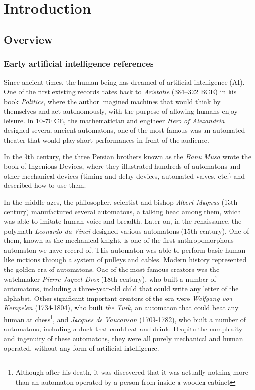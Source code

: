 \chapter{Introduction} \label{ch:introduction}
\section{Overview}
\subsection{Early artificial intelligence references}
Since ancient times, the human being has dreamed of artificial intelligence (AI). One of the first existing records dates back to \textit{Aristotle} (384–322 BCE) in his book \textit{Politics}, where the author imagined machines that would think by themselves and act autonomously, with the purpose of allowing humans enjoy leisure. In 10-70 CE, the mathematician and engineer \textit{Hero of Alexandria} designed several ancient automatons, one of the most famous was an automated theater that would play short performances in front of the audience.

In the 9th century, the three Persian brothers known as the \textit{Banū Mūsā} wrote the book of Ingenious Devices, where they illustrated hundreds of automatons and other mechanical devices (timing and delay devices, automated valves, etc.) and described how to use them.

In the middle ages, the philosopher, scientist and bishop \textit{Albert Magnus} (13th century) manufactured several automatons, a talking head among them, which was able to imitate human voice and breadth. Later on, in the renaissance, the polymath \textit{Leonardo da Vinci} designed various automatons (15th century). One of them, known as the mechanical knight, is one of the first anthropomorphous automaton we have record of. This automaton was able to perform basic human-like motions through a system of pulleys and cables. Modern history represented the golden era of automatons. One of the most famous creators was the watchmaker \textit{Pierre Jaquet-Droz} (18th century), who built a number of automatons, including a three-year-old child that could write any letter of the alphabet. Other significant important creators of the era were \textit{Wolfgang von Kempelen} (1734-1804), who built \textit{the Turk}, an automaton that could beat any human at chess\footnote{Although after his death, it was discovered that it was actually nothing more than an automaton operated by a person from inside a wooden cabinet }, and \textit{Jacques de Vaucanson} (1709-1782), who built a number of automatons, including a duck that could eat and drink. Despite the complexity and ingenuity of these automatons, they were all purely mechanical and human operated, without any form of artificial intelligence.

